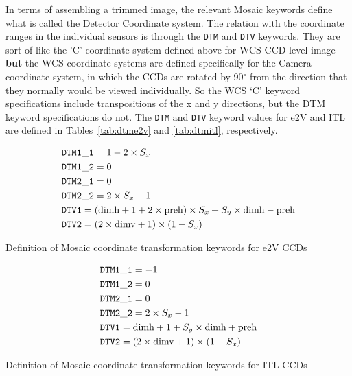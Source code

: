 \documentclass{article}[12pt]
\begin{document}
{In terms of assembling a trimmed image, the relevant Mosaic keywords define what is called the Detector Coordinate system.  The relation with the coordinate ranges in the individual sensors is through the {\tt DTM} and {\tt DTV} keywords.  
They are sort of like the 'C' coordinate system defined above for WCS CCD-level image {\bf but} the WCS coordinate systems are defined specifically for the Camera coordinate system, in which the CCDs are rotated by 90$^\circ$ from the direction that they normally would be viewed individually.  So the WCS `C' keyword specifications include transpositions of the x and y directions, but the DTM keyword specifications do not.  The {\tt DTM} and {\tt DTV} keyword values for e2V and ITL are defined in Tables~\ref{tab:dtme2v} and \ref{tab:dtmitl}, respectively.

\begin{table}
\begin{align*}
& {\tt DTM1\_1} =  1 - 2 \times S_x \\
& {\tt DTM1\_2} = 0 \\
& {\tt DTM2\_1} = 0 \\
& {\tt DTM2\_2} = 2 \times S_x - 1 \\
& {\tt DTV1} = ({\rm dimh} + 1 + 2 \times {\rm preh}) \times S_x + S_y \times {\rm dimh} - {\rm preh} \\
& {\tt DTV2} = (2 \times {\rm dimv} + 1) \times (1 - S_x) \\
\end{align*}
\caption{Definition of Mosaic coordinate transformation keywords for e2V CCDs\label{tab:dtme2v}}

\end{table}

\begin{table}
\begin{align*}
& {\tt DTM1\_1} = -1 \\
& {\tt DTM1\_2} = 0 \\
& {\tt DTM2\_1} = 0 \\
& {\tt DTM2\_2} = 2 \times S_x - 1 \\
& {\tt DTV1} = {\rm dimh} + 1 + S_y \times {\rm dimh} + {\rm preh}  \\
& {\tt DTV2} = (2 \times {\rm dimv} + 1) \times (1 - S_x) \\
\end{align*}
\caption{Definition of Mosaic coordinate transformation keywords for ITL CCDs\label{tab:dtmitl}}
\end{table}


}
\end{document}
